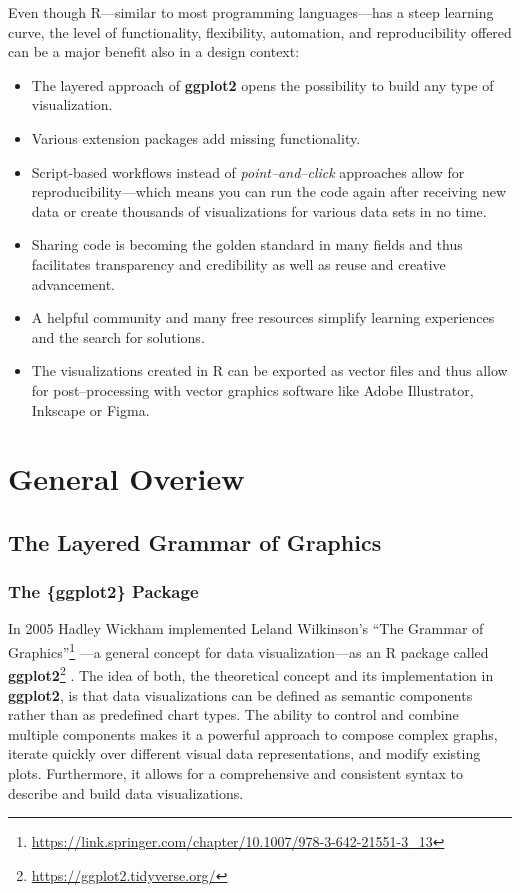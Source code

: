 \documentclass[
]{krantz}
\providecommand{\tightlist}{%
  \setlength{\itemsep}{0pt}\setlength{\parskip}{0pt}}
\renewcommand{\href}[2]{#2\footnote{\url{#1}}}
\begin{document}
Even though R---similar to most programming languages---has a steep learning curve, the level of functionality, flexibility, automation, and reproducibility offered can be a major benefit also in a design context:

\begin{itemize}
\tightlist
\item
  The layered approach of \textbf{ggplot2} opens the possibility to build any type of visualization.
\item
  Various extension packages add missing functionality.
\item
  Script-based workflows instead of \emph{point--and--click} approaches allow for reproducibility---which means you can run the code again after receiving new data or create thousands of visualizations for various data sets in no time.
\item
  Sharing code is becoming the golden standard in many fields and thus facilitates transparency and credibility as well as reuse and creative advancement.
\item
  A helpful community and many free resources simplify learning experiences and the search for solutions.
\item
  The visualizations created in R can be exported as vector files and thus allow for post--processing with vector graphics software like Adobe Illustrator, Inkscape or Figma.
\end{itemize}

\hypertarget{part-general-overiew}{%
\part{General Overiew}\label{part-general-overiew}}

\hypertarget{grammar}{%
\chapter{The Layered Grammar of Graphics}\label{grammar}}

\hypertarget{ggplot}{%
\section{The \{ggplot2\} Package}\label{ggplot}}

In 2005 Hadley Wickham implemented Leland Wilkinson's \href{https://link.springer.com/chapter/10.1007/978-3-642-21551-3_13}{``The Grammar of Graphics''} \citep{wilkinson2005}---a general concept for data visualization---as an R package called \href{https://ggplot2.tidyverse.org/}{\textbf{ggplot2}} \citep{ggplot2}. The idea of both, the theoretical concept and its implementation in \textbf{ggplot2}, is that data visualizations can be defined as semantic components rather than as predefined chart types. The ability to control and combine multiple components makes it a powerful approach to compose complex graphs, iterate quickly over different visual data representations, and modify existing plots. Furthermore, it allows for a comprehensive and consistent syntax to describe and build data visualizations.
\end{document}
